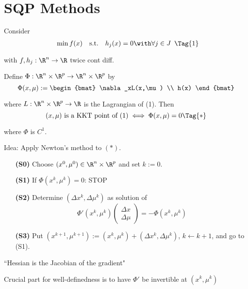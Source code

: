 
\section{SQP Methods}

Consider
\begin{equation*}
  \begin{array}{l l l}
    \min f(x) & \text{s.t.} & h_j(x)=0\with\forall j\in J
  \end{array}\Tag{1}
\end{equation*}

with $f,h_j:\R^n\to\R$ twice cont diff.

Define $\Phi:\R^n\times\R^p\to\R^n\times\R^p$ by
$$
  \Phi(x,\mu):=\begin{bmat}
    \nabla_xL(x,\mu) \\ h(x)
  \end{bmat}
$$

where $L:\R^n\times\R^p\to\R$ is the Lagrangian of (1). Then
\begin{equation*}
  (x,\mu)\text{ is a KKT point of (1)}\iff\Phi(x,\mu)=0\Tag{*}
\end{equation*}

where $\Phi$ is $C^1$.

Idea: Apply Newton's method to $(*)$.

\label{faafd8f}

\begin{enumerate}
  \item [\textbf{(S0)}] Choose $(x^0,\mu^0)\in\R^n\times\R^p$ and set $k:=0$.
  \item [\textbf{(S1)}] If $\Phi(x^k,\mu^k)=0$: STOP
  \item [\textbf{(S2)}] Determine $(\Delta x^k,\Delta\mu^k)$ as solution of
        $$
          \Phi'(x^k,\mu^k)\begin{pmatrix}\Delta x\\\Delta\mu\end{pmatrix}=-\Phi(x^k,\mu^k)
        $$
  \item [\textbf{(S3)}] Put $(x^{k+1},\mu^{k+1}):=(x^k,\mu^k)+(\Delta x^k,\Delta\mu^k)$, $k\gets k+1$, and go to (S1).
\end{enumerate}

``Hessian is the Jacobian of the gradient"

Crucial part for well-definedness is to have $\Phi'$ be invertible at
$(x^k,\mu^k)$

